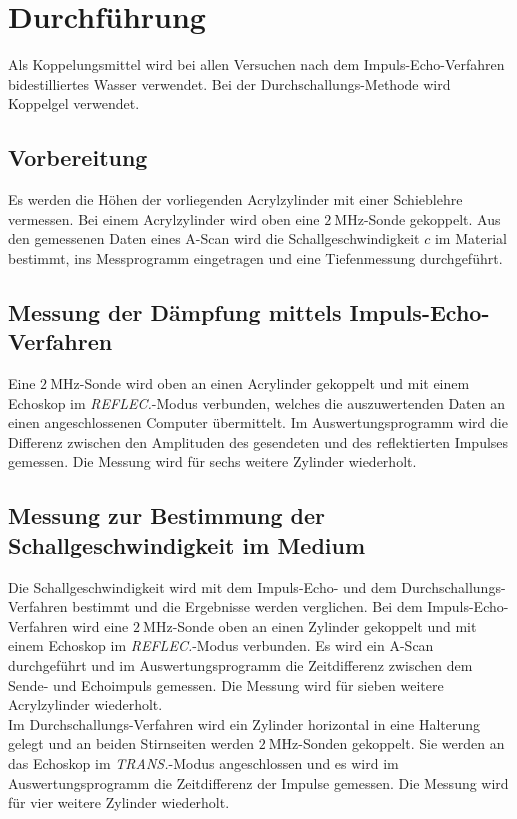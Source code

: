 \section{Durchführung}
\label{sec:Durchführung}

Als Koppelungsmittel wird bei allen Versuchen nach dem Impuls-Echo-Verfahren bidestilliertes Wasser verwendet. Bei der Durchschallungs-Methode wird Koppelgel verwendet.

\subsection{Vorbereitung}
Es werden die Höhen der vorliegenden Acrylzylinder mit einer Schieblehre vermessen. Bei einem Acrylzylinder wird oben eine $\SI{2}{\mega\hertz}$-Sonde gekoppelt.
Aus den gemessenen Daten eines A-Scan wird die Schallgeschwindigkeit $c$ im Material bestimmt, ins Messprogramm eingetragen und eine Tiefenmessung durchgeführt.

\subsection{Messung der Dämpfung mittels Impuls-Echo-Verfahren}
Eine $\SI{2}{\mega\hertz}$-Sonde wird oben an einen Acrylinder gekoppelt und mit einem Echoskop im \textit{REFLEC.}-Modus verbunden, welches die auszuwertenden Daten an einen angeschlossenen Computer übermittelt.
Im Auswertungsprogramm wird die Differenz zwischen den Amplituden des gesendeten und des reflektierten Impulses gemessen. 
Die Messung wird für sechs weitere Zylinder wiederholt.

\subsection{Messung zur Bestimmung der Schallgeschwindigkeit im Medium}
Die Schallgeschwindigkeit wird mit dem Impuls-Echo- und dem Durchschallungs-Verfahren bestimmt und die Ergebnisse werden verglichen.
Bei dem Impuls-Echo-Verfahren wird eine $\SI{2}{\mega\hertz}$-Sonde oben an einen Zylinder gekoppelt und mit einem Echoskop im \textit{REFLEC.}-Modus verbunden.
Es wird ein A-Scan durchgeführt und im Auswertungsprogramm die Zeitdifferenz zwischen dem Sende- und Echoimpuls gemessen. Die Messung wird für sieben weitere Acrylzylinder wiederholt.\\
Im Durchschallungs-Verfahren wird ein Zylinder horizontal in eine Halterung gelegt und an beiden Stirnseiten werden $\SI{2}{\mega\hertz}$-Sonden gekoppelt. Sie werden an das Echoskop im \textit{TRANS.}-Modus angeschlossen und es wird im Auswertungsprogramm die Zeitdifferenz der Impulse gemessen.
Die Messung wird für vier weitere Zylinder wiederholt.

